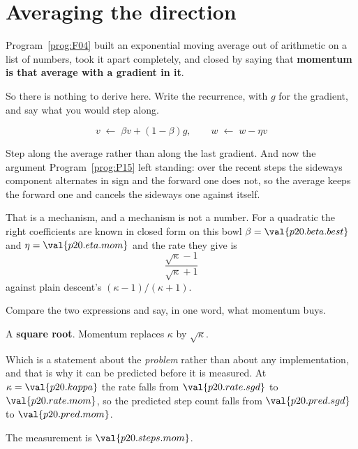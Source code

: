\section{Averaging the direction}
\label{sec:P20-momentum}

\begin{fr}
Program~\ref{prog:F04} built an exponential moving average out of arithmetic
on a list of numbers, took it apart completely, and closed by saying that
\textbf{momentum is that average with a gradient in it}.

So there is nothing to derive here. Write the recurrence, with $g$ for the
gradient, and say what you would step along.
\dotline
\nextframe
\end{fr}

\begin{fr}
\begin{ansblock}
\[ v \;\leftarrow\; \beta v + (1-\beta) g, \qquad
   w \;\leftarrow\; w - \eta v \]
\end{ansblock}

Step along the average rather than along the last gradient. And now the
argument Program~\ref{prog:P15} left standing: over the recent steps the
sideways component alternates in sign and the forward one does not, so the
average keeps the forward one and cancels the sideways one against itself.

\end{fr}

\begin{fr}
That is a mechanism, and a mechanism is not a number. For a quadratic the
right coefficients are known in closed form \dash{} on this bowl
$\beta = \val{p20.beta.best}$ and $\eta = \val{p20.eta.mom}$ \dash{} and the
rate they give is
\[ \frac{\sqrt{\kappa} - 1}{\sqrt{\kappa} + 1} \]
against plain descent's $(\kappa-1)/(\kappa+1)$.

Compare the two expressions and say, in one word, what momentum buys.
\nextframe
\end{fr}

\begin{fr}
\begin{ansblock}
A \textbf{square root}. Momentum replaces $\kappa$ by $\sqrt{\kappa}$.
\end{ansblock}

Which is a statement about the \emph{problem} rather than about any
implementation, and that is why it can be predicted before it is measured. At
$\kappa = \val{p20.kappa}$ the rate falls from $\val{p20.rate.sgd}$ to
$\val{p20.rate.mom}$, so the predicted step count falls from
$\val{p20.pred.sgd}$ to $\val{p20.pred.mom}$.

The measurement is $\val{p20.steps.mom}$.
\end{fr}

